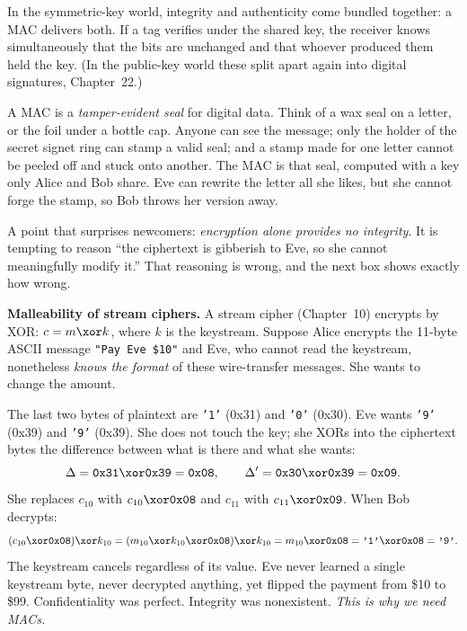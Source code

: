 In the symmetric-key world, integrity and authenticity come bundled together: a MAC delivers both. If a tag verifies under the shared key, the receiver knows simultaneously that the bits are unchanged and that whoever produced them held the key. (In the public-key world these split apart again into digital signatures, Chapter~22.)

\begin{intuitionbox}
A MAC is a \emph{tamper-evident seal} for digital data. Think of a wax seal on a letter, or the foil under a bottle cap. Anyone can see the message; only the holder of the secret signet ring can stamp a valid seal; and a stamp made for one letter cannot be peeled off and stuck onto another. The MAC is that seal, computed with a key only Alice and Bob share. Eve can rewrite the letter all she likes, but she cannot forge the stamp, so Bob throws her version away.
\end{intuitionbox}

A point that surprises newcomers: \emph{encryption alone provides no integrity}. It is tempting to reason ``the ciphertext is gibberish to Eve, so she cannot meaningfully modify it.'' That reasoning is wrong, and the next box shows exactly how wrong.

\begin{attackbox}
\textbf{Malleability of stream ciphers.} A stream cipher (Chapter~10) encrypts by XOR: $c = m \xor k$, where $k$ is the keystream. Suppose Alice encrypts the 11-byte ASCII message \texttt{"Pay Eve \$10"} and Eve, who cannot read the keystream, nonetheless \emph{knows the format} of these wire-transfer messages. She wants to change the amount.

The last two bytes of plaintext are \texttt{'1'} (0x31) and \texttt{'0'} (0x30). Eve wants \texttt{'9'} (0x39) and \texttt{'9'} (0x39). She does not touch the key; she XORs into the ciphertext bytes the difference between what is there and what she wants:
\[
\Delta = \texttt{0x31}\xor\texttt{0x39} = \texttt{0x08},\qquad \Delta' = \texttt{0x30}\xor\texttt{0x39} = \texttt{0x09}.
\]
She replaces $c_{10}$ with $c_{10}\xor\texttt{0x08}$ and $c_{11}$ with $c_{11}\xor\texttt{0x09}$. When Bob decrypts:
\[
(c_{10}\xor\texttt{0x08})\xor k_{10} = (m_{10}\xor k_{10}\xor\texttt{0x08})\xor k_{10} = m_{10}\xor\texttt{0x08} = \texttt{'1'}\xor\texttt{0x08} = \texttt{'9'}.
\]
The keystream cancels regardless of its value. Eve never learned a single keystream byte, never decrypted anything, yet flipped the payment from \$10 to \$99. Confidentiality was perfect. Integrity was nonexistent. \emph{This is why we need MACs.}
\end{attackbox}

